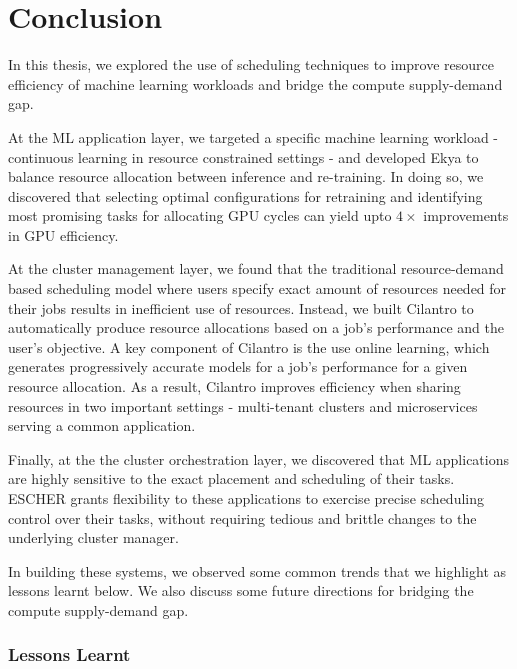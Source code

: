 \chapter{Conclusion}
\label{ch_conclusion}

In this thesis, we explored the use of scheduling techniques to improve resource efficiency of machine learning workloads and bridge the compute supply-demand gap.

At the ML application layer, we targeted a specific machine learning workload - continuous learning in resource constrained settings - and developed Ekya to balance resource allocation between inference and re-training. In doing so, we discovered that selecting optimal configurations for retraining and identifying most promising tasks for allocating GPU cycles can yield upto $4\times$ improvements in GPU efficiency.

At the cluster management layer, we found that the traditional resource-demand based scheduling model where users specify exact amount of resources needed for their jobs results in inefficient use of resources. Instead, we built Cilantro to automatically produce resource allocations based on a job's performance and the user's objective. A key component of Cilantro is the use online learning, which generates progressively accurate models for a job's performance for a given resource allocation. As a result, Cilantro improves efficiency when sharing resources in two important settings - multi-tenant clusters and microservices serving a common application. 

Finally, at the the cluster orchestration layer, we discovered that ML applications are highly sensitive to the exact placement and scheduling of their tasks. ESCHER grants flexibility to these applications to exercise precise scheduling control over their tasks, without requiring tedious and brittle changes to the underlying cluster manager.

In building these systems, we observed some common trends that we highlight as lessons learnt below. We also discuss some future directions for bridging the compute supply-demand gap.

\subsection{Lessons Learnt}


